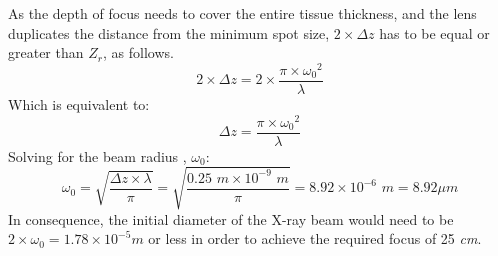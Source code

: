\documentclass[12pt]{article}
\begin{document}
As the depth of focus needs to cover the entire tissue thickness, and the lens duplicates the distance from the minimum spot size, $2 \times \Delta z$ has to be equal or greater than $Z_r$, as follows.
\[
    2\times\Delta z = 2\times\frac{\pi \times {\omega_0}^2}{\lambda}
\]
Which is equivalent to:
\[
    \Delta z = \frac{\pi \times {\omega_0}^2}{\lambda}
\]
Solving for the beam radius , $\omega_0$:
\[
\omega_0 = \sqrt{\frac{\Delta z\times\lambda}{\pi}} = \sqrt{\frac{0.25\textit{ m}\times10^{-9}\textit{ m}}{\pi}} = 8.92\times10^{-6}\textit{ m} = 8.92 \mu\textit{m}
\]
In consequence, the initial diameter of the X-ray beam would need to be $2\times\omega_0 = 1.78 \times10^{-5} \textit{m}$ or less in order to achieve the required focus of 25 \textit{cm}.
\end{document}

